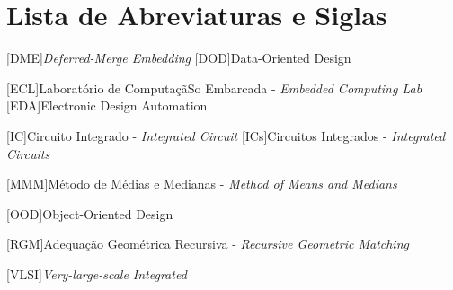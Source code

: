 \chapter * {Lista de Abreviaturas e Siglas}
\thispagestyle{empty}
\label{acro}


\begin{acronym}
\setlength{\parskip}{0ex}
\setlength{\itemsep}{1ex}


\renewcommand{\baselinestretch}{0.25}%
\large\normalsize%






[DME]{\textit{Deferred-Merge Embedding}}
[DOD]{Data-Oriented Design}

[ECL]{Laboratório de ComputaçãSo Embarcada - \textit{Embedded Computing Lab}}
[EDA]{Electronic Design Automation}




[IC]{Circuito Integrado - \textit{Integrated Circuit}}
[ICs]{Circuitos Integrados - \textit{Integrated Circuits}}



[MMM]{Método de Médias e Medianas - \textit{Method of Means and Medians}}


[OOD]{Object-Oriented Design}



[RGM]{Adequação Geométrica Recursiva - \textit{Recursive Geometric Matching}}




[VLSI]{\textit{Very-large-scale Integrated}}





\end{acronym}
